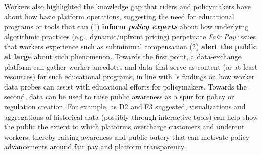 {Workers also highlighted the knowledge gap that riders and policymakers have about how basic platform operations, suggesting the need for educational programs or tools that can (1) \textbf{inform \textit{policy experts}} about how underlying algorithmic practices (e.g., dynamic/upfront pricing) perpetuate \textit{Fair Pay} issues that workers experience such as subminimal compensation (2) \textbf{alert the public at large} about such phenomenon. 
Towards the first point, a data-exchange platform can gather worker anecdotes and data that serve as content (or at least resources) for such educational programs, in line with \citet{policy_probes}'s findings on how worker data probes can assist with educational efforts for policymakers. 
Towards the second, data can be used to raise public awareness as a spur for policy or regulation creation. 
    For example, as D2 and F3 suggested,  visualizations and aggregations of historical data (possibly through interactive tools) can help show the public the extent to which platforms overcharge customers and undercut workers, thereby raising awareness and public outcry that can motivate policy advancements around fair pay and platform transparency. 
}

